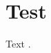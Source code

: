 \documentclass{article}
\begin{document}
\section{Test}\label{sec:test}
\nocite{k1}\nocite{k2, k3}Text \cite{k4}.


\end{document}
